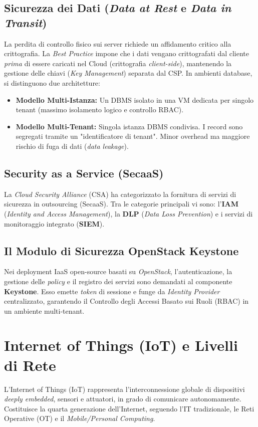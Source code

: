 \subsection{Sicurezza dei Dati (\textit{Data at Rest} e \textit{Data in Transit})}
La perdita di controllo fisico sui server richiede un affidamento critico alla crittografia. La \textit{Best Practice} impone che i dati vengano crittografati dal cliente \textit{prima} di essere caricati nel Cloud (crittografia \textit{client-side}), mantenendo la gestione delle chiavi (\textit{Key Management}) separata dal CSP.
In ambienti database, si distinguono due architetture:
\begin{itemize}
    \item \textbf{Modello Multi-Istanza:} Un DBMS isolato in una VM dedicata per singolo tenant (massimo isolamento logico e controllo RBAC).
    \item \textbf{Modello Multi-Tenant:} Singola istanza DBMS condivisa. I record sono segregati tramite un "identificatore di tenant". Minor overhead ma maggiore rischio di fuga di dati (\textit{data leakage}).
\end{itemize}

\subsection{Security as a Service (SecaaS)}
La \textit{Cloud Security Alliance} (CSA) ha categorizzato la fornitura di servizi di sicurezza in outsourcing (SecaaS). Tra le categorie principali vi sono: l'\textbf{IAM} (\textit{Identity and Access Management}), la \textbf{DLP} (\textit{Data Loss Prevention}) e i servizi di monitoraggio integrato (\textbf{SIEM}).

\subsection{Il Modulo di Sicurezza OpenStack Keystone}
Nei deployment IaaS open-source basati su \textit{OpenStack}, l'autenticazione, la gestione delle \textit{policy} e il registro dei servizi sono demandati al componente \textbf{Keystone}. Esso emette \textit{token} di sessione e funge da \textit{Identity Provider} centralizzato, garantendo il Controllo degli Accessi Basato sui Ruoli (RBAC) in un ambiente multi-tenant.

\section{Internet of Things (IoT) e Livelli di Rete}
L'Internet of Things (IoT) rappresenta l'interconnessione globale di dispositivi \textit{deeply embedded}, sensori e attuatori, in grado di comunicare autonomamente. Costituisce la quarta generazione dell'Internet, seguendo l'IT tradizionale, le Reti Operative (OT) e il \textit{Mobile/Personal Computing}.

